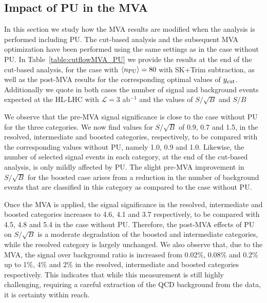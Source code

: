 \subsection{Impact of PU in the MVA}

In this section we study how the MVA results are modified
when the analysis is performed including PU.
%
The cut-based analysis and the subsequent
MVA optimization have been performed using the same
settings as in the case without PU.
%
In Table~\ref{table:cutflowMVA_PU} we provide the results
  at the end of the cut-based analysis,
  for the case with $\left\langle n_{\rm PU}\right\rangle=80$ with SK+Trim
  subtraction,
  as well as the post-MVA results for the
  corresponding optimal values of $y_{\rm cut}$.
  Additionally we quote in
  both cases the number of signal and
    background events expected
    at the HL-LHC with $\mathcal{L}=3$ ab$^{-1}$
    and the values of $S/\sqrt{B}$ and $S/B$

  
We observe that the pre-MVA 
signal significance is close
to the case without PU for the three categories.
%
We now find values for $S/\sqrt{B}$ of 0.9, 0.7 and 1.5, in the resolved,
intermediate and boosted categories, respectively, to be compared
with the corresponding values without PU, namely 1.0, 0.9 and 1.0.
%
Likewise, the number of selected
signal events in each category, at the
end of the cut-based analysis, is only mildly affected
by PU.
%
The slight pre-MVA improvement in $S/\sqrt{B}$ for the
boosted case arises from a reduction in the number
of background events that are classified in this category
as compared to the case without PU.


Once the MVA is applied, the signal significance in the 
resolved, intermediate and boosted
categories increases to 4.6, 4.1 and 3.7 respectively,
to be compared with 4.5, 4.8 and 5.4 in the case
without PU.
%
Therefore, the post-MVA effects of PU on $S/\sqrt{B}$ is
a moderate degradation of the boosted and intermediate categories,
while the resolved category is largely unchanged.
%
We also observe that, due
to the MVA, the
signal over background ratio is increased from 0.02\%, 0.08\% and
0.2\% up to 1\%, 4\% and 2\% in the resolved, intermediate
and boosted categories respectively.
%
This indicates that while this measurement is still highly challenging,
requiring a careful extraction of the QCD
background from the data, it is certainty within reach.

